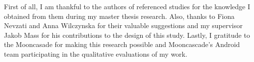 First of all, I am thankful to the authors of referenced studies for the knowledge I obtained from them during my master thesis research. Also, thanks to Fiona Nevzati and Anna Wilczynska for their valuable suggestions and my supervisor Jakob Mass for his contributions to the design of this study. Lastly, I gratitude to the Mooncasade for making this research possible and Mooncascade's Android team participating in the qualitative evaluations of my work.
